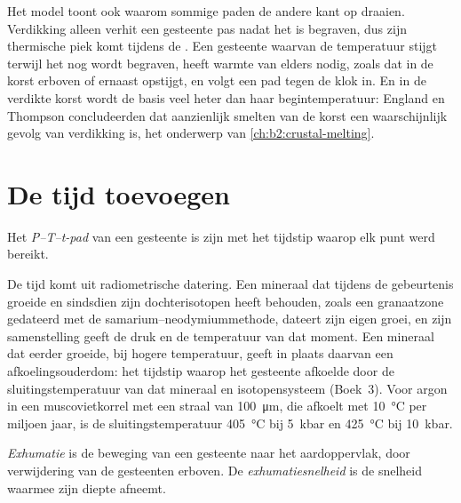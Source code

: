 Het model toont ook waarom sommige paden de andere kant op draaien. Verdikking alleen verhit een gesteente
pas nadat het is begraven, dus zijn thermische piek komt tijdens de . Een gesteente waarvan
de temperatuur stijgt terwijl het nog wordt begraven, heeft warmte van elders nodig, zoals 
dat in de korst erboven of ernaast opstijgt, en volgt een pad tegen de klok in. En in de
verdikte korst wordt de basis veel heter dan haar begintemperatuur: England en Thompson
concludeerden dat aanzienlijk smelten van de korst een waarschijnlijk gevolg van verdikking is,
het onderwerp van \cref{ch:b2:crustal-melting}.

\section{De tijd toevoegen}\label{sec:b2:pt-paths:time}

\begin{definition}[P--T--t-pad]\label{def:b2:pt-paths:ptt}
Het \emph{P--T--t-pad} van een gesteente is zijn  met het tijdstip
waarop elk punt werd bereikt.
\end{definition}

De tijd komt uit radiometrische datering. Een mineraal dat tijdens de gebeurtenis groeide en sindsdien
zijn dochterisotopen heeft behouden, zoals een granaatzone gedateerd met de
samarium--neodymiummethode, dateert zijn eigen groei, en zijn
samenstelling geeft de druk en de temperatuur van dat moment. Een mineraal dat
eerder groeide, bij hogere temperatuur, geeft in plaats daarvan een afkoelingsouderdom: het tijdstip waarop het gesteente
afkoelde door de sluitingstemperatuur van dat mineraal en isotopensysteem
(Boek~3). Voor argon in een muscovietkorrel met een straal van \qty{100}{\micro m}, die afkoelt met
\qty{10}{\celsius} per miljoen jaar, is de sluitingstemperatuur \qty{405}{\celsius} bij
\qty{5}{kbar} en \qty{425}{\celsius} bij \qty{10}{kbar}.

\begin{definition}\label{def:b2:pt-paths:exhumation}
\emph{Exhumatie} is de beweging van een gesteente naar het aardoppervlak,
door verwijdering van de gesteenten erboven. De \emph{exhumatiesnelheid} is de
snelheid waarmee zijn diepte afneemt.
\end{definition}


